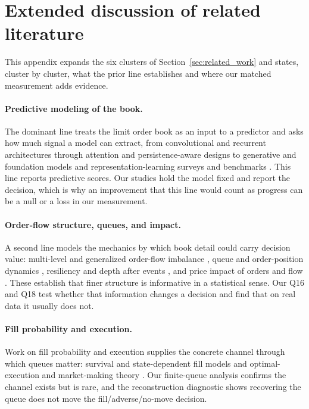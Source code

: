 \section{Extended discussion of related literature}
\label{app:extlit}

This appendix expands the six clusters of Section~\ref{sec:related_work} and states, cluster
by cluster, what the prior line establishes and where our matched measurement adds evidence.

\paragraph{Predictive modeling of the book.} The dominant line treats the limit order book as
an input to a predictor and asks how much signal a model can extract, from convolutional and
recurrent architectures \citep{sirignano2016deep, zihao2018deeplob, nousi2018machine,
zhang2018bdlob} through attention and persistence-aware designs \citep{jung2024attention,
briola2024hlob, lorenzo2022short, briola2024deep} to generative and foundation models
\citep{yanzhi2026m, zihao2021deep, backhouse2025painting} and representation-learning
surveys and benchmarks \citep{zhong2025representation, ntakaris2017benchmark, nagy2025lob,
cao2022dslob}. This line reports predictive scores. Our studies hold the model fixed and
report the decision, which is why an improvement that this line would count as progress can
be a null or a loss in our measurement.

\paragraph{Order-flow structure, queues, and impact.} A second line models the mechanics by
which book detail could carry decision value: multi-level and generalized order-flow imbalance
\citep{ke2019multi, rama2010price, su2021price, hu2025stochastic, lipton2013trade}, queue and
order-position dynamics \citep{guo2015dynamics, cont2012order, toke2013order, toke2016modelling,
cont2019stochastic}, resiliency and depth after events \citep{bechler2017order, xu2016limit,
krause2021two}, and price impact of orders and flow \citep{said2018market, brokmann2014slow,
lemhadri2018market, huang2019glosten}. These establish that finer structure is informative in
a statistical sense. Our Q16 and Q18 test whether that information changes a decision and find
that on real data it usually does not.

\paragraph{Fill probability and execution.} Work on fill probability and execution supplies the
concrete channel through which queues matter: survival and state-dependent fill models
\citep{alvaro2023deep, lokin2024fill, guo2015dynamics} and optimal-execution and
market-making theory \citep{kato2014vwap, kato2009optimal, curato2014optimal, bechler2014optimal,
chavezcasillas2024adaptive, baldacci2021optimal}. Our finite-queue analysis confirms the channel
exists but is rare, and the reconstruction diagnostic shows recovering the queue does not move
the fill/adverse/no-move decision.

